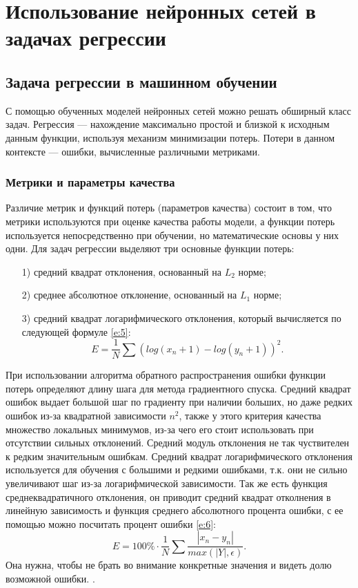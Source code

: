 \chapter{Использование нейронных сетей в задачах регрессии}

\section{Задача регрессии в машинном обучении}
С помощью обученных моделей нейронных сетей можно решать обширный класс задач. Регрессия — нахождение максимально простой и близкой к исходным данным функции, используя механизм минимизации потерь. Потери в данном контексте — ошибки, вычисленные различными метриками.
\subsection{Метрики и параметры качества}
Различие метрик и функций потерь (параметров качества) состоит в том, что метрики используются при оценке качества работы модели, а функции потерь используется непосредственно при обучении, но математические основы у них одни.\cite{31, 32}
Для задач регрессии выделяют три основные функции потерь:
\begin{enumerate}
    \item [1)] средний квадрат отклонения, основанный на $L_{2}$ норме;
    \item [2)] среднее абсолютное отклонение, основанный на $L_{1}$ норме;
    \item [3)] средний квадрат логарифмического отклонения, который вычисляется по следующей формуле \ref{e:5}:
    \begin{equation}\label{e:5}
    E = \frac{1}{N}\sum (log(x_{n}+1)-log(y_{n} + 1))^2.
    \end{equation}
\end{enumerate}
При использовании алгоритма обратного распространения ошибки функции потерь определяют длину шага для метода градиентного спуска. Средний квадрат ошибок выдает большой шаг по градиенту при наличии больших, но даже редких ошибок из-за квадратной зависимости $n^2$, также у этого критерия качества множество локальных минимумов, из-за чего его стоит использовать при отсутствии сильных отклонений. Средний модуль отклонения не так чуствителен к редким значительным ошибкам. Средний квадрат логарифмического отклонения используется для обучения с большими и редкими ошибками, т.к. они не сильно увеличивают шаг из-за логарифмической зависимости. Так же есть функция среднеквадратичного отклонения, он приводит средний квадрат отколнения в линейную зависимость и функция среднего абсолютного процента ошибки, с ее помощью можно посчитать процент ошибки \ref{e:6}:
\begin{equation} \label{e:6}
    E = 100\% \cdot \frac{1}{N}\sum \frac{|x_{n}-y_{n}|}{max(|Y|, \epsilon)}.
\end{equation}
Она нужна, чтобы не брать во внимание конкретные значения и видеть долю возможной ошибки.
\cite{20}.
